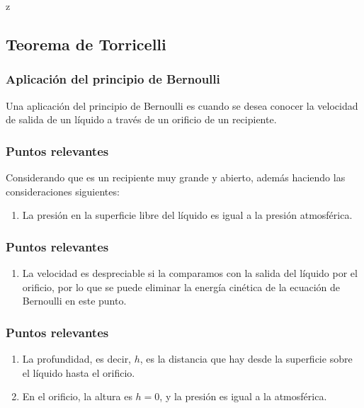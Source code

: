 z\documentclass[14pt]{beamer}
\begin{document}
\subsection{Teorema de Torricelli}

\begin{frame}
\frametitle{Aplicación del principio de Bernoulli}
Una aplicación del principio de Bernoulli es cuando se desea conocer la velocidad de salida de un líquido a través de un orificio de un recipiente.
\end{frame}
\begin{frame}
\frametitle{Puntos relevantes}    
Considerando que es un recipiente muy grande y abierto, además haciendo las consideraciones siguientes:
\begin{enumerate}[<+->]
\item La presión en la superficie libre del líquido es igual a la presión atmosférica.
\seti
\end{enumerate}
\end{frame}
\begin{frame}
\frametitle{Puntos relevantes}    
\begin{enumerate}[<+->]    
\conti
\item La velocidad es despreciable si la comparamos con la salida del líquido por el orificio, por lo que se puede eliminar la energía cinética de la ecuación de Bernoulli en este punto.
\seti
\end{enumerate}
\end{frame}
\begin{frame}
\frametitle{Puntos relevantes}    
\begin{enumerate}[<+->]    
\conti
\item La profundidad, es decir, $h$, es la distancia que hay desde la superficie sobre el líquido hasta el orificio.
\item En el orificio, la altura es $h = 0$, y la presión es igual a la atmosférica.
\end{enumerate}
\end{frame}
\end{document}
